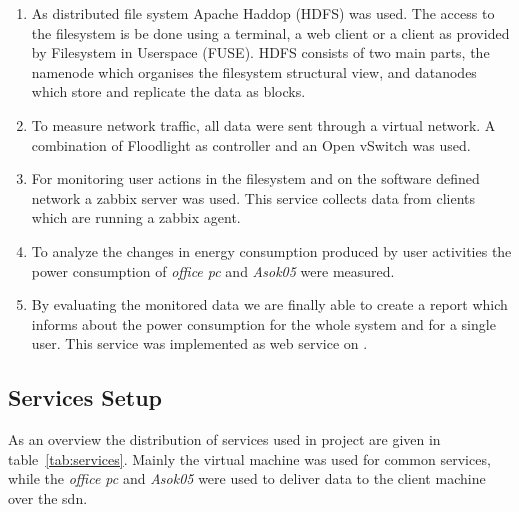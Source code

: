 \begin{enumerate}

\item As distributed file system Apache Haddop\textsuperscript{\textregistered} (HDFS) was used. The access to the filesystem is be done using a terminal, a web client or a client as provided by Filesystem in Userspace (FUSE). HDFS consists of two main parts, the namenode which organises the filesystem structural view, and datanodes which store and replicate the data as blocks.

\item To measure network traffic, all data were sent through a virtual network. A combination of Floodlight as controller and an Open vSwitch was used. 

\item For monitoring user actions in the filesystem and on the software defined network a zabbix server was used. This service collects data from clients which are running a zabbix agent.

\item To analyze the changes in energy consumption produced by user activities the power consumption of \textit{office pc} and \textit{Asok05} were measured.

\item By evaluating the monitored data we are finally able to create a  report which informs about the power consumption for the whole system and for a single user. This service was implemented as web service on .

\end{enumerate}

\subsection{Services Setup}

As an overview the distribution of services used in project are given in table~\ref{tab:services}. Mainly the virtual machine was used for common services, while the \textit{office pc} and \textit{Asok05} were used to deliver data to the client machine over the sdn.


